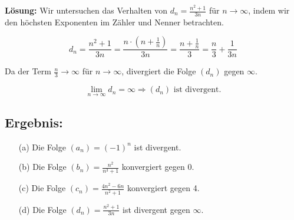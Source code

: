 \documentclass[11pt]{article}
\begin{document}
\textbf{Lösung:} Wir untersuchen das Verhalten von \( d_n = \frac{n^2 + 1}{3n} \) für \( n \to \infty \), indem wir den höchsten Exponenten im Zähler und Nenner betrachten.

\[
d_n = \frac{n^2 + 1}{3n} = \frac{n \cdot \left(n + \frac{1}{n}\right)}{3n} = \frac{n + \frac{1}{n}}{3} = \frac{n}{3} + \frac{1}{3n}
\]

Da der Term \( \frac{n}{3} \to \infty \) für \( n \to \infty \), divergiert die Folge \( (d_n) \) gegen \( \infty \).

\[
\lim_{n \to \infty} d_n = \infty \Rightarrow (d_n) \text{ ist divergent.}
\]

\subsection*{Ergebnis:}
\begin{enumerate}
    \item[(a)] Die Folge \( (a_n) = (-1)^n \) ist divergent.
    \item[(b)] Die Folge \( (b_n) = \frac{n^2}{n^3 + 1} \) konvergiert gegen 0.
    \item[(c)] Die Folge \( (c_n) = \frac{4n^2 - 6n}{n^2 + 1} \) konvergiert gegen 4.
    \item[(d)] Die Folge \( (d_n) = \frac{n^2 + 1}{3n} \) ist divergent gegen \( \infty \).
\end{enumerate}
\end{document}
